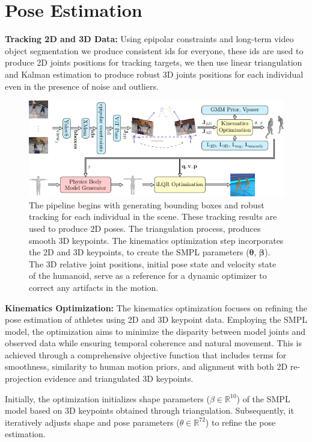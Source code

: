 \documentclass{egpubl}
\begin{document}
\section{Pose Estimation}

\textbf{Tracking 2D and 3D Data:} Using epipolar constraints and long-term video object segmentation we produce consistent ids for everyone, these ids are used to produce 2D joints positions for tracking targets, we then use linear triangulation and Kalman estimation to produce robust 3D joints positions for each individual even in the presence of noise and outliers.   
\begin{figure}[!ht]
\includegraphics[width=0.73\linewidth]{pipeline.pdf}
 \centering
  \caption{The pipeline begins with generating bounding boxes  and robust tracking  for each individual in the scene. These tracking results are used to produce 2D poses. The triangulation process, produces smooth 3D keypoints. The kinematics optimization step incorporates the 2D and 3D keypoints, to create the SMPL parameters ($\mathbf{\theta}$, $\mathbf{\beta}$). The 3D relative joint positions, initial pose state  and velocity state of the humanoid, serve as a reference for a dynamic optimizer to correct any artifacts in the motion.}
  \label{fig:teaser}
\end{figure}
\textbf{Kinematics Optimization:} The kinematics optimization focuses on refining the pose estimation of athletes using 2D and 3D keypoint data. Employing the SMPL model, the optimization aims to minimize the disparity between model joints and observed data while ensuring temporal coherence and natural movement. This is achieved through a comprehensive objective function that includes terms for smoothness, similarity to human motion priors, and alignment with both 2D re-projection evidence and triangulated 3D keypoints.

Initially, the optimization initializes shape parameters ($\beta \in \mathbb{R}^{10}$) of the SMPL model based on 3D keypoints obtained through triangulation. Subsequently, it iteratively adjusts shape and pose parameters ($\theta \in \mathbb{R}^{72}$) to refine the pose estimation.
\end{document}
